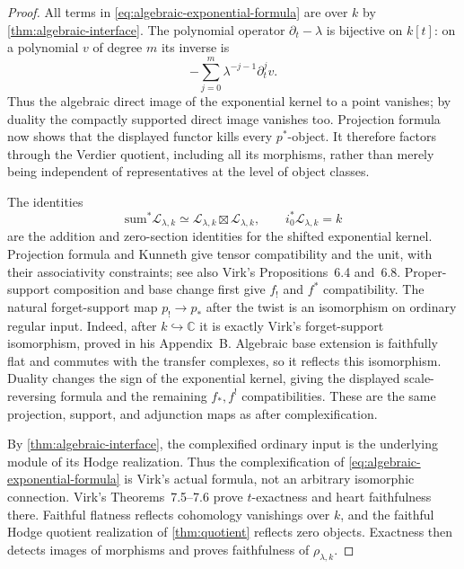 \documentclass[11pt]{article}
\numberwithin{equation}{section}
\theoremstyle{definition}
\theoremstyle{remark}
\newcommand{\C}{\mathbb C}
\begin{document}
\begin{proof}
All terms in \eqref{eq:algebraic-exponential-formula} are over $k$ by
\cref{thm:algebraic-interface}. The polynomial operator
$\partial_t-\lambda$ is bijective on $k[t]$: on a polynomial $v$ of
degree $m$ its inverse is
\[
 -\sum_{j=0}^{m}\lambda^{-j-1}\partial_t^jv.
\]
Thus the algebraic direct image of the exponential kernel to a point
vanishes; by duality the compactly supported direct image vanishes too.
Projection formula now shows that the displayed functor kills every
$p^*$-object. It therefore factors through the Verdier quotient, including
all its morphisms, rather than merely being independent of representatives
at the level of object classes.

The identities
\[
 \mathrm{sum}^*\mathscr L_{\lambda,k}
 \simeq\mathscr L_{\lambda,k}\boxtimes\mathscr L_{\lambda,k},
 \qquad i_0^*\mathscr L_{\lambda,k}=k
\]
are the addition and zero-section identities for the shifted exponential
kernel. Projection formula and Kunneth give tensor compatibility and the
unit, with their associativity constraints; see also Virk's
Propositions~6.4 and~6.8. Proper-support composition and base change first
give $f_!$ and $f^*$ compatibility. The natural forget-support map
$p_!\to p_*$ after the twist is an isomorphism on ordinary regular
input. Indeed, after $k\hookrightarrow\C$ it is exactly Virk's
forget-support isomorphism, proved in his Appendix~B. Algebraic base
extension is faithfully flat and commutes with the transfer complexes, so
it reflects this isomorphism. Duality changes the sign of the exponential
kernel, giving the displayed scale-reversing formula and the remaining
$f_*,f^!$ compatibilities. These are the same projection, support, and
adjunction maps as after complexification.

By \cref{thm:algebraic-interface}, the complexified ordinary input is
the underlying module of its Hodge realization. Thus the complexification
of \eqref{eq:algebraic-exponential-formula} is Virk's actual formula, not
an arbitrary isomorphic connection. Virk's Theorems~7.5--7.6 prove
$t$-exactness and heart faithfulness there. Faithful flatness reflects
cohomology vanishings over $k$, and the faithful Hodge quotient realization
of \cref{thm:quotient} reflects zero objects. Exactness then detects
images of morphisms and proves faithfulness of $\rho_{\lambda,k}$.
\end{proof}
\end{document}
